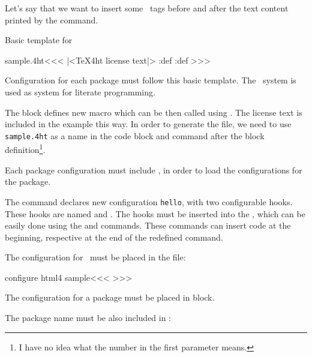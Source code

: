 Let's say that we want to insert some \HTML\ tags before and after the text content printed by the command.

Basic template for 

\begin{texsource}
\<sample.4ht\><<<
|<TeX4ht license text|>
\pend:def
\append:def
>>> 
\end{texsource}

Configuration for each package must follow this basic template. The \ProTeX\ system is used as system for literate programming.

The  block defines new macro which can be then called using . The license text
is included in the example this way. In order to generate the  file, we need to use \texttt{sample.4ht} as a name
in the code block and command  after the block definition\footnote{I have no idea what the number
in the first parameter means.}.

Each package configuration  must include , in order to load the configurations for the package.

The command  declares new configuration \texttt{hello}, with two configurable hooks. 
These hooks are named   and . The hooks must be inserted into the 
\texcommand{\hello}, which can be easily done using the  and  commands. These
commands can insert code  at the beginning, respective at the end of the redefined command.

The configuration for \HTML\ must be placed in the  file:


\begin{texsource}
\<configure html4 sample\><<<
>>>
\end{texsource}

The configuration for a package must be placed in  block.


The package name must be also included in :

